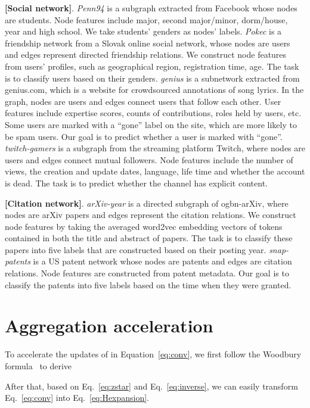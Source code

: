 \documentclass[nohyperref]{article}
\theoremstyle{plain}
\theoremstyle{definition}
\theoremstyle{remark}
\begin{document}
\noindent{\small}
\textbf{[Social network]}.
\emph{Penn94} is a subgraph extracted from Facebook whose nodes are students.
Node features include major, second major/minor, dorm/house, year and high school.
We take students' genders as nodes' labels. 
\emph{Pokec} is a friendship network from a Slovak online social network,
whose nodes are users and edges represent directed friendship relations.
We construct node features from users' profiles, 
such as geographical region, registration time, age.
The task is to classify users based on their genders.
\emph{genius} is a subnetwork extracted from genius.com,
which is a website for crowdsourced annotations of song lyrics.
In the graph,
nodes are users and edges connect users that follow each other.
User features include expertise scores, 
counts of contributions, roles held by users, etc.
Some users are marked with a ``gone'' label on the site, 
which are more likely to be spam users.
Our goal is to predict whether a user is marked with ``gone''.
\emph{twitch-gamers}
is a subgraph from the streaming platform Twitch,
where nodes are users and edges connect mutual followers.
Node features include 
the number of views,
the creation and update dates,
language,
life time 
and whether the account is dead.
The task is to predict whether the channel has explicit content.



\noindent{\small}
\textbf{[Citation network]}.
\emph{arXiv-year} is a directed subgraph of ogbn-arXiv, 
where nodes are arXiv papers and edges represent the citation relations.
We construct node features by 
taking the averaged word2vec embedding vectors of tokens 
contained in both the title and abstract of papers.
The task is to classify these papers into five labels that are constructed based on their posting year.
\emph{snap-patents}
is a US patent network whose nodes are patents and edges are citation relations.
Node features are constructed from patent metadata.
Our goal is to classify the patents into five labels based on the time when they were granted.


\section{Aggregation acceleration}
\label{sec:agg}
To accelerate the updates of  in Equation~\ref{eq:conv},
we first follow the Woodbury formula~\cite{max1950inverting} to derive
\begin{small}

\end{small}
After that,
based on Eq.~\ref{eq:zstar} and Eq.~\ref{eq:inverse},
we can easily transform Eq.~\ref{eq:conv} into Eq.~\ref{eq:Hexpansion}.
\end{document}
